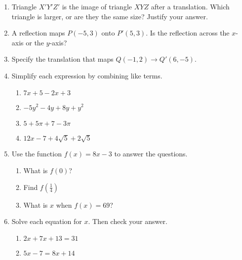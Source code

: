 \documentclass[12pt, twoside]{article}
\begin{document}
\begin{enumerate}[itemsep=0.5cm]
\item Triangle $X'Y'Z'$ is the image of triangle $XYZ$ after a translation. Which triangle is larger, or are they the same size? Justify your answer. \vspace{3cm}

\item A reflection maps $P(-5,3)$ onto $P'(5,3)$. Is the reflection across the $x$-axis or the $y$-axis? \vspace{2cm}

\item Specify the translation that maps $Q(-1,2)\rightarrow Q'(6,-5)$.


\newpage
\item Simplify each expression by combining like terms.
  \begin{multicols}{2}
      \begin{enumerate}[itemsep=1.5cm]
        \item $7x+5-2x+3$
        \item $-5y^2-4y+8y+y^2$
        \item $5+5\pi+7-3\pi$
        \item $12x-7+4\sqrt{5}+2\sqrt{5}$
      \end{enumerate}
  \end{multicols} \vspace{1cm}

\item Use the function $f(x) = 8x-3$ to answer the questions.
  \begin{multicols}{2}
  \begin{enumerate}[itemsep=2cm]
      \item What is $f(0)$?
      \item Find $f(\frac{1}{4})$
      \item What is $x$ when $f(x) = 69$?
  \end{enumerate}
  \end{multicols} \vspace{2cm}

\item Solve each equation for $x$. Then check your answer.
  \begin{multicols}{2}
    \begin{enumerate}[itemsep=1cm]
  \item $2x+7x+13=31$
  \item $5x-7=8x+14$
  \end{enumerate}
  \end{multicols}


\end{enumerate}
\end{document}
